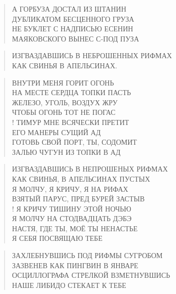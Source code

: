 \poemtitle{***}
\begin{verse}
А ГОРБУЗА ДОСТАЛ ИЗ ШТАНИН\\
ДУБЛИКАТОМ БЕСЦЕННОГО ГРУЗА\\
НЕ БУКЛЕТ С НАДПИСЬЮ ЕСЕНИН\\
МАЯКОВСКОГО ВЫНЕС С-ПОД ПУЗА
\end{verse}

\poemtitle{***}
\begin{verse}
ИЗГВАЗДАВШИСЬ В НЕБРОШЕННЫХ РИФМАХ\\
КАК СВИНЬЯ В АПЕЛЬСИНАХ.
\end{verse}

\poemtitle{***}
\begin{verse}
ВНУТРИ МЕНЯ ГОРИТ ОГОНЬ\\
НА МЕСТЕ СЕРДЦА ТОПКИ ПАСТЬ\\
ЖЕЛЕЗО, УГОЛЬ, ВОЗДУХ ЖРУ\\
ЧТОБЫ ОГОНЬ ТОТ НЕ ПОГАС\\!
ТИМУР МНЕ ВСЯЧЕСКИ ПРЕТИТ\\
ЕГО МАНЕРЫ СУЩИЙ АД\\
ГОТОВЬ СВОЙ ПОРТ, ТЫ, СОДОМИТ\\
ЗАЛЬЮ ЧУГУН ИЗ ТОПКИ В АД
\end{verse}

\poemtitle{***}
\begin{verse}
ИЗГВАЗДАВШИСЬ В НЕПРОШЕНЫХ РИФМАХ\\
КАК СВИНЬЯ, В АПЕЛЬСИНАХ ПУСТЫХ\\
Я МОЛЧУ, Я КРИЧУ, Я НА РИФАХ\\
ВЗЯТЫЙ ПАРУС, ПРЕД БУРЕЙ ЗАСТЫВ\\!
Я КРИЧУ ТИШИНУ ЭТОЙ НОЧЬЮ\\
Я МОЛЧУ НА СТОДВАДЦАТЬ ДЭБЭ\\
НАСТЯ, ГДЕ ТЫ, МОЁ ТЫ НЕНАСТЬЕ\\
Я СЕБЯ ПОСВЯЩАЮ ТЕБЕ
\end{verse}

\poemtitle{***}
\begin{verse}
ЗАХЛЕБНУВШИСЬ ПОД РИФМЫ СУГРОБОМ\\
ЗАЗВЕНЕВ КАК ПИНГВИН В ЯНВАРЕ\\
ОСЦИЛЛОГРАФА СТРЕЛКОЙ ВЗМЕТНУВШИСЬ\\
НАШЕ ЛИБИДО СТЕКАЕТ К ТЕБЕ
\end{verse}

